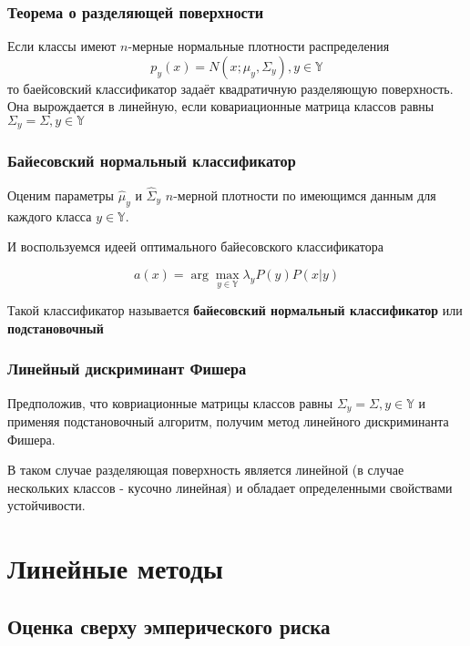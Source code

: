 \documentclass{beamer}
\begin{document}
	\begin{frame}
		\frametitle{Теорема о разделяющей поверхности}
		Если классы имеют $n$-мерные нормальные плотности распределения
		\[
		p_y(x) = N(x; \mu_y, \Sigma_y), y \in \mathbb{Y}
		\]
		то баейсовский классификатор задаёт квадратичную разделяющую поверхность.
		Она вырождается в линейную, если ковариационные матрица классов равны $\Sigma_y = \Sigma, y \in \mathbb{Y}$
	\end{frame}
	
	\begin{frame}
		\frametitle{Байесовский нормальный классификатор}
		Оценим параметры $\hat{\mu}_y$ и $\hat{\Sigma}_y$ $n$-мерной плотности  по имеющимся данным для каждого класса $y \in \mathbb{Y}$.
		
		\vspace{5pt}
		
		И воспользуемся идеей оптимального байесовского классификатора
		
		\[
		a(x) = \arg \max_{y \in \mathbb{Y}} \lambda_{y} P(y) P(x | y)
		\]
		
		\vspace{15pt}
		
		Такой классификатор называется \textbf{байесовский нормальный классификатор} или \textbf{подстановочный}
	\end{frame}
	
	\begin{frame}
		\frametitle{Линейный дискриминант Фишера}
		Предположив, что ковриационные матрицы классов равны $\Sigma_y = \Sigma, y \in \mathbb{Y}$ и применяя подстановочный алгоритм, получим метод линейного дискриминанта Фишера.
		
		\vspace{15pt}
		
		В таком случае разделяющая поверхность является линейной (в случае нескольких классов - кусочно линейная) и обладает определенными свойствами устойчивости.
	\end{frame}
	
	\section{Линейные методы}
	
	\subsection{Оценка сверху эмперического риска}
	
\end{document}
